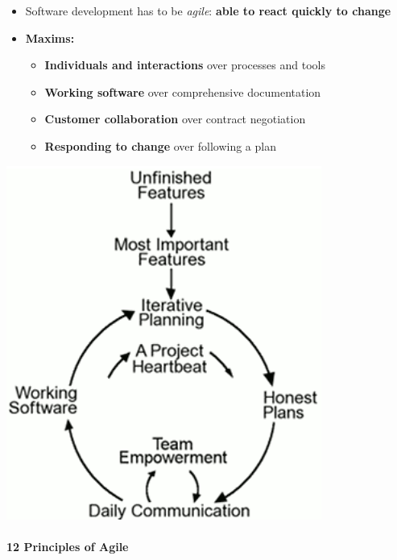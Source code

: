 \documentclass[a4paper]{article}
\providecommand{\tightlist}{%
  \setlength{\itemsep}{0pt}\setlength{\parskip}{0pt}}
\let\oldparagraph\paragraph
\renewcommand{\paragraph}[1]{\oldparagraph{#1}\mbox{}}
\begin{document}
\begin{itemize}
\tightlist
\item
  Software development has to be \emph{agile}: \textbf{able to react
  quickly to change}
\item
  \textbf{Maxims:}

  \begin{itemize}
  \tightlist
  \item
    \textbf{Individuals and interactions} over processes and tools
  \item
    \textbf{Working software} over comprehensive documentation
  \item
    \textbf{Customer collaboration} over contract negotiation
  \item
    \textbf{Responding to change} over following a plan
  \end{itemize}
\end{itemize}

\includegraphics{2C-SE.assets/1543146629660.png}

\hypertarget{12-principles-of-agile}{%
\paragraph{12 Principles of Agile}\label{12-principles-of-agile}}
\end{document}
